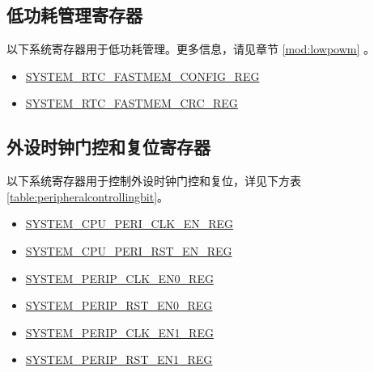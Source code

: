 \documentclass[main\_\_CN.tex]{subfiles}
\begin{document}
\subsection{低功耗管理寄存器}

以下系统寄存器用于低功耗管理。更多信息，请见章节 \ref{mod:lowpowm} \textit{}。
\begin{itemize}
    \item \hyperref[regdesc:SYSTEMRTCFASTMEMCONFIGREG]{SYSTEM\_RTC\_FASTMEM\_CONFIG\_REG}
    \item \hyperref[regdesc:SYSTEMRTCFASTMEMCRCREG]{SYSTEM\_RTC\_FASTMEM\_CRC\_REG}
\end{itemize}


\subsection{外设时钟门控和复位寄存器}

以下系统寄存器用于控制外设时钟门控和复位，详见下方表 \ref{table:peripheralcontrollingbit}。

\begin{itemize}
    \item \hyperref[regdesc:SYSTEMCPUPERICLKENREG]{SYSTEM\_CPU\_PERI\_CLK\_EN\_REG}
    \item \hyperref[regdesc:SYSTEMCPUPERIRSTENREG]{SYSTEM\_CPU\_PERI\_RST\_EN\_REG}
    \item \hyperref[regdesc:SYSTEMPERIPCLKEN0REG]{SYSTEM\_PERIP\_CLK\_EN0\_REG}
    \item \hyperref[regdesc:SYSTEMPERIPRSTEN0REG]{SYSTEM\_PERIP\_RST\_EN0\_REG}
    \item \hyperref[regdesc:SYSTEMPERIPCLKEN1REG]{SYSTEM\_PERIP\_CLK\_EN1\_REG}
    \item \hyperref[regdesc:SYSTEMPERIPRSTEN1REG]{SYSTEM\_PERIP\_RST\_EN1\_REG}
\end{itemize}
\end{document}
